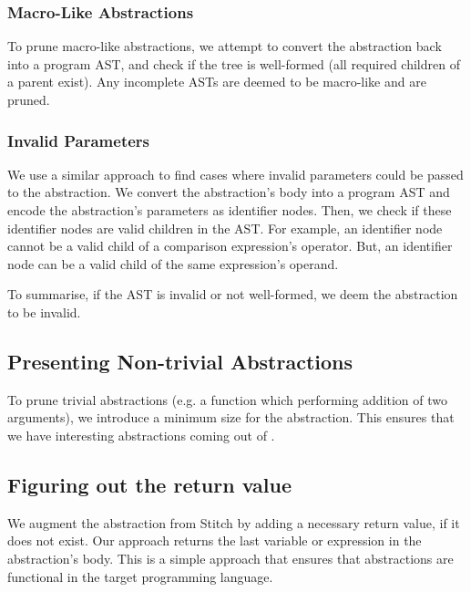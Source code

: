 \subsubsection{Macro-Like Abstractions}
To prune macro-like abstractions, we attempt to convert the abstraction back into a program AST, and check if the tree is well-formed (all required children of a parent exist). Any incomplete ASTs are deemed to be macro-like and are pruned.

\subsubsection{Invalid Parameters}
We use a similar approach to find cases where invalid parameters could be passed to the abstraction. We convert the abstraction's body into a program AST and encode the abstraction's parameters as identifier nodes. 
Then, we check if these identifier nodes are valid children in the AST. For example, an identifier node cannot be a valid child of a comparison expression's operator. But, an identifier node can be a valid child of the same expression's operand. 

To summarise, if the AST is invalid or not well-formed, we deem the abstraction to be invalid.

\subsection{Presenting Non-trivial Abstractions}

To prune trivial abstractions (e.g. a function which performing addition of two arguments), we introduce a minimum size for the abstraction. This ensures that we have interesting abstractions coming out of \toolname.


\subsection{Figuring out the return value}

We augment the abstraction from Stitch by adding a necessary return value, if it does not exist. Our approach returns the last variable or expression in the abstraction's body. This is a simple approach that ensures that abstractions are functional in the target programming language. 



